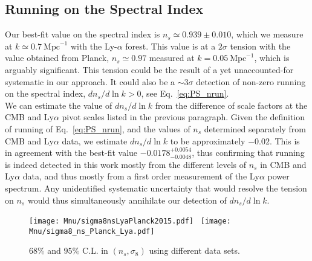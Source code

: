 \subsection{Running on the Spectral Index}

Our best-fit value on the spectral index is $n_s \simeq 0.939 \pm 0.010$, which we measure at $k \simeq 0.7~\mathrm{Mpc}^{-1}$ with the Ly-$\alpha$ forest. This value is at a $2\sigma$ tension with the value obtained from Planck, $n_s \simeq 0.97$ measured at $k = 0.05~\mathrm{Mpc}^{-1}$, which is arguably significant. This tension could be the result of a yet unaccounted-for systematic in our approach. It could also be a $\sim 3 \sigma$ detection of non-zero running on the spectral index, $d n_s / d \ln k > 0$, see Eq.~\ref{eq:PS_nrun}. \\

We can estimate the value of  $d n_s/d \ln k$  from the difference of scale factors at the CMB and Ly$\alpha$ pivot scales listed in the previous paragraph. Given the definition of running of Eq.~\ref{eq:PS_nrun}, and the values of $n_s$ determined separately from CMB and Ly$\alpha$ data, we estimate $d n_s/d \ln k$ to be approximately $-0.02$. This is in  agreement with the best-fit value $ -0.0178_{-0.0048}^{+0.0054} $, thus confirming that running is indeed detected in this work mostly from the different levels of $n_s$ in CMB and Ly$\alpha$ data, and thus mostly from a first order measurement of the Ly$\alpha$ power spectrum.  Any unidentified systematic uncertainty that would resolve the tension on $n_s$ would thus simultaneously annihilate our detection of $d n_s/d \ln k$. \\

\begin{figure}
\begin{center}
\texttt{[image: Mnu/sigma8nsLyaPlanck2015.pdf]}~%
\texttt{[image: Mnu/sigma8\_ns\_Planck\_Lya.pdf]}
\caption{$68\%$ and $95\%$ C.L. in $\left( n_s, \sigma_8 \right)$ using different data sets.}
\label{fig:c2d_ns}
\end{center}
\end{figure}

